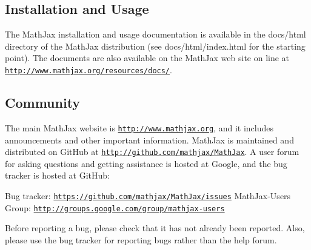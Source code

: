 \subsection*{Installation and Usage}

The Math\-Jax installation and usage documentation is available in the {\ttfamily docs/html} directory of the Math\-Jax distribution (see {\ttfamily docs/html/index.\-html} for the starting point). The documents are also available on the Math\-Jax web site on line at \href{http://www.mathjax.org/resources/docs/}{\tt http\-://www.\-mathjax.\-org/resources/docs/}.

\subsection*{Community}

The main Math\-Jax website is \href{http://www.mathjax.org}{\tt http\-://www.\-mathjax.\-org}, and it includes announcements and other important information. Math\-Jax is maintained and distributed on Git\-Hub at \href{http://github.com/mathjax/MathJax}{\tt http\-://github.\-com/mathjax/\-Math\-Jax}. A user forum for asking questions and getting assistance is hosted at Google, and the bug tracker is hosted at Git\-Hub\-:

Bug tracker\-: \href{https://github.com/mathjax/MathJax/issues}{\tt https\-://github.\-com/mathjax/\-Math\-Jax/issues} Math\-Jax-\/\-Users Group\-: \href{http://groups.google.com/group/mathjax-users}{\tt http\-://groups.\-google.\-com/group/mathjax-\/users}

Before reporting a bug, please check that it has not already been reported. Also, please use the bug tracker for reporting bugs rather than the help forum. 